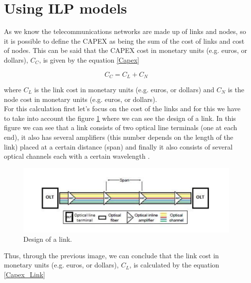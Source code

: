 \clearpage

\section{Using ILP models}\label{ILP_CAPEX}

As we know the telecommunications networks are made up of links and nodes, so it is possible to define the CAPEX as being the sum of the cost of links and cost of nodes\cite{aulas}. This can be said that the CAPEX cost in monetary units (e.g. euros, or dollars), $C_C$, is given by the equation \ref{Capex}

\begin{equation}
C_C = C_L + C_N
\label{Capex}
\end{equation}

\noindent
where $C_L$	is the link cost in monetary units (e.g. euros, or dollars) and $C_N$ is the node cost in monetary units (e.g. euros, or dollars).\\

For this calculation first let's focus on the cost of the links and for this we have to take into account the figure \ref{link_design} where we can see the design of a link. In this figure we can see that a link consists of two optical line terminals (one at each end), it also has several amplifiers (this number depends on the length of the link) placed at a certain distance (span) and finally it also consists of several optical channels each with a certain wavelength \cite{aulas}\cite{ramas2010}.\\

\begin{figure}[h!]
\centering
\includegraphics[width=\textwidth]{sdf/ILP/figures/link_design}
\caption{Design of a link.}
\label{link_design}
\end{figure}

\vspace{13pt}
Thus, through the previous image, we can conclude that the link cost in monetary units (e.g. euros, or dollars), $C_L$, is calculated by the equation \ref{Capex_Link}

